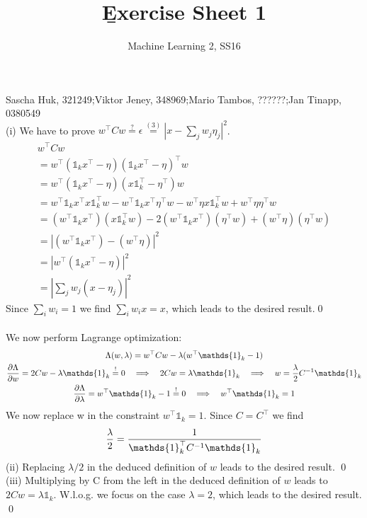 \documentclass[a4paper]{article}
\newcommand{\eqs}[1]{ \stackrel{#1}{=}  }
\newcommand{\eqq}{  \overset{\text{!}}{=} }
\newcommand{\wt}{\w^\top}
\newcommand{\w}{w}
\newcommand{\1}{\mathds{1}}
\begin{document}
\title{\b{Exercise Sheet 1}}
\author{Machine Learning 2, SS16}

\maketitle

Sascha Huk, 321249;\quad Viktor Jeney, 348969;\quad Mario Tambos, ??????;\quad Jan Tinapp, 0380549\\


 
(i) We have to prove $\wt C\w \eqs{?} \epsilon \eqs{(3)} |x-\sum_jw_j\eta_j|^2	$. \\
\begin{gather*}
	\wt C\w
	\\ 
	= \wt (\1_kx^\top - \eta)(\1_kx^\top - \eta)^\top\w 
	\\
	= \wt (\1_kx^\top - \eta)(x\1_k^\top - \eta^\top)\w 
	\\	
	= \wt\1_kx^\top x\1_k^\top\w - \wt\1_kx^\top \eta^\top\w
	  - \wt\eta x\1_k^\top\w +\wt\eta \eta^\top\w
	\\
	= (\wt\1_kx^\top)(x\1_k^\top\w) - 2(\wt\1_kx^\top)(\eta^\top\w) + (\wt\eta)(\eta^\top\w)
	\\
	= |(\wt\1_kx^\top) - (\wt\eta)|^2
	\\
	= |\wt(\1_kx^\top - \eta)|^2
	\\
	= |\sum_jw_j(x - \eta_j)|^2	
\end{gather*}
Since $\sum_iw_i=1$ we find $\sum_iw_ix=x$, which leads to the desired result.\qed
\\
\\
We now perform Lagrange optimization:  
\begin{gather*}
	\Lambda(w,\lambda) = \wt Cw - \lambda(\wt\mathds{1}_k - 1)
	\\
	{\partial\Lambda \over \partial w} = 2C\w - \lambda\1_k \eqq 0 
	\quad\Longrightarrow\quad 
	2C\w = \lambda\1_k
	\quad\Longrightarrow\quad
	\w = {\lambda \over 2} C^{-1} \1_k
	\\
	{\partial\Lambda \over \partial \lambda} = \wt\1_k - 1 \eqq 0
	\quad\Longrightarrow\quad 
	\wt\1_k = 1 
\end{gather*}
We now replace w in the constraint $\wt\1_k = 1 $. Since $C=C^\top$ we find 
\begin{gather*}
	{\lambda \over 2} = {1\over \1_k^\top C^{-1}\1_k } 
\end{gather*}
(ii) Replacing $\lambda/2$ in the deduced definition of $w$ leads to the desired result. \qed\\
(iii) Multiplying by C from the left in the deduced definition of $w$ leads to $2Cw=\lambda\1_k$. 
W.l.o.g. we focus on the case $\lambda=2$, which leads to the desired result.   \qed
\end{document}
